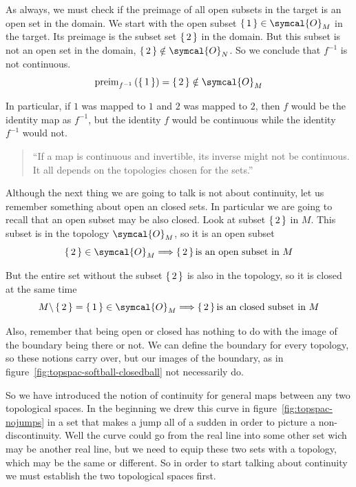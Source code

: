   As always, we must check if the preimage of all open subsets in the target is
  an open set in the domain. We start with the open subset
  $\set{1}\in\symcal{O}_M$ in the target. Its preimage is the subset set
  $\set{2}$ in the domain. But this subset is not an open set in the domain,
  $\set{2}\notin\symcal{O}_N$. So we conclude that $f^{-1}$ is not
  continuous\footnotemark{}.
  \[
    \text{preim}_{f^{-1}}\,(\set{1}) = \set{2} \notin \symcal{O}_M
  \]

  In particular, if $1$ was mapped to $1$ and $2$ was mapped to $2$, then $f$
  would be the identity map as $f^{-1}$, but the identity $f$ would be
  continuous while the identity $f^{-1}$ would not\footnotemark{}.

  \begin{quote}
    ``If a map is continuous and invertible, its inverse might not be
    continuous. It all depends on the topologies chosen for the sets.''
  \end{quote}

  Although the next thing we are going to talk is not about continuity, let us
  remember something about open an closed sets. In particular we are going to
  recall that an open subset may be also closed. Look at subset $\set{2}$ in
  $M$. This subset is in
  the topology $\symcal{O}_M$, so it is an open subset
  \[
    \set{2}\in\symcal{O}_M
    \Longrightarrow \set{2}
    \text{is an open subset in } M
  \]
  
  But the entire set without the subset $\set{2}$ is also in the topology, so
  it is closed at the same time
  \[
    M \backslash\set{2} = \set{1}\in\symcal{O}_M
    \Longrightarrow
    \set{2} \text{is an closed subset in } M
  \]

  Also, remember that being open or closed has nothing to do with the image of
  the boundary being there or not. We can define the boundary for every
  topology, so these notions carry over, but our images of the boundary, as in
  figure~\ref{fig:topspac-softball-closedball} not necessarily do.

  So we have introduced the notion of continuity for general maps between any
  two topological spaces. In the beginning we drew this curve in
  figure~\ref{fig:topspac-nojumps} in a set that makes a jump all of a sudden
  in order to picture a non-discontinuity. Well the curve could go from the
  real line into some other set wich may be another real line, but we need to
  equip these two sets with a topology, which may be the same or different. So
  in order to start talking about continuity we must establish the two
  topological spaces first.

